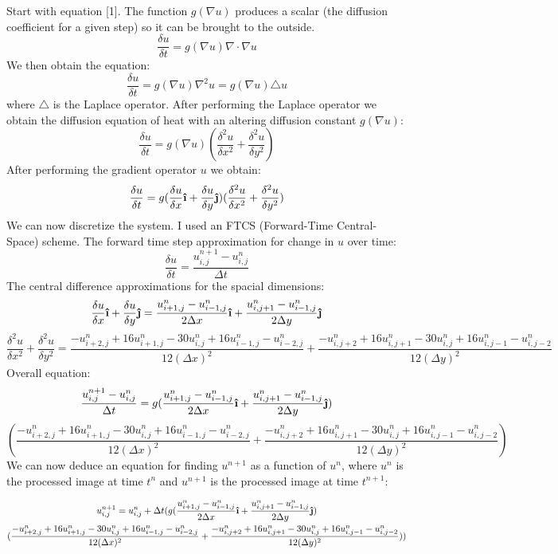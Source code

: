 \documentclass[12pt]{article}
\newcommand{\ihat}{\boldsymbol{\hat{\textbf{\i}}}}
\newcommand{\jhat}{\boldsymbol{\hat{\textbf{\j}}}}
\begin{document}
Start with equation [1]. The function $g(\nabla u)$ produces a scalar (the diffusion coefficient for a given step) so it can be brought to the outside.
$$\frac{\delta u}{\delta t}=g(\nabla u) \nabla \cdot \nabla u$$
We then obtain the equation:
$$\frac{\delta u}{\delta t}=g(\nabla u) \nabla^2 u = g(\nabla u) \triangle u$$
where $\triangle$ is the Laplace operator.
After performing the Laplace operator we obtain the diffusion equation of heat with an altering diffusion constant $g(\nabla u)$:
\begin{equation}
\frac{\delta u}{\delta t}=g(\nabla u)(\frac{\delta^2 u}{\delta x^2}+\frac{\delta^2 u}{\delta y^2})
\end{equation}
After performing the gradient operator $u$ we obtain:
$$\frac{\delta u}{\delta t}=g(\frac{\delta u}{\delta x}\ihat+\frac{\delta u}{\delta y}\jhat)(\frac{\delta^2 u}{\delta x^2}+\frac{\delta^2 u}{\delta y^2})$$
We can now discretize the system. I used an FTCS (Forward-Time Central-Space) scheme.
The forward time step approximation for change in $u$ over time:
$$\frac{\delta u}{\delta t}=\frac{u^{n+1}_{i,j} - u^{n}_{i,j}}{\Delta t}$$
The central difference approximations for the spacial dimensions:
$$\frac{\delta u}{\delta x}\ihat+\frac{\delta u}{\delta y}\jhat=\frac{u^{n}_{i+1,j}-u^{n}_{i-1,j}}{2\Delta x}\ihat + \frac{u^{n}_{i,j+1}-u^{n}_{i-1,j}}{2\Delta y}\jhat$$
$$\frac{\delta^2 u}{\delta x^2}+\frac{\delta^2 u}{\delta y^2}=\frac{-u^{n}_{i+2,j}+16u^{n}_{i+1,j}-30u^{n}_{i,j}+16u^{n}_{i-1,j}-u^{n}_{i-2,j}}{12(\Delta x)^2}+\frac{-u^{n}_{i,j+2}+16u^{n}_{i,j+1}-30u^{n}_{i,j}+16u^{n}_{i,j-1}-u^{n}_{i,j-2}}{12(\Delta y)^2}$$
Overall equation:
$$\frac{u^{n+1}_{i,j} - u^{n}_{i,j}}{\Delta t}=g(\frac{u^{n}_{i+1,j}-u^{n}_{i-1,j}}{2\Delta x}\ihat + \frac{u^{n}_{i,j+1}-u^{n}_{i-1,j}}{2\Delta y}\jhat)$$
$$(\frac{-u^{n}_{i+2,j}+16u^{n}_{i+1,j}-30u^{n}_{i,j}+16u^{n}_{i-1,j}-u^{n}_{i-2,j}}{12(\Delta x)^2}+\frac{-u^{n}_{i,j+2}+16u^{n}_{i,j+1}-30u^{n}_{i,j}+16u^{n}_{i,j-1}-u^{n}_{i,j-2}}{12(\Delta y)^2})$$
We can now deduce an equation for finding $u^{n+1}$ as a function of $u^{n}$, where $u^{n}$ is the processed image at time $t^n$ and $u^{n+1}$ is the processed image at time $t^{n+1}$:

\begin{multline}
u^{n+1}_{i,j} = u^{n}_{i,j} + \Delta t (g(\frac{u^{n}_{i+1,j}-u^{n}_{i-1,j}}{2\Delta x}\ihat + \frac{u^{n}_{i,j+1}-u^{n}_{i-1,j}}{2\Delta y}\jhat) \\
(\frac{-u^{n}_{i+2,j}+16u^{n}_{i+1,j}-30u^{n}_{i,j}+16u^{n}_{i-1,j}-u^{n}_{i-2,j}}{12(\Delta x)^2}+\frac{-u^{n}_{i,j+2}+16u^{n}_{i,j+1}-30u^{n}_{i,j}+16u^{n}_{i,j-1}-u^{n}_{i,j-2}}{12(\Delta y)^2}))
\end{multline}
\end{document}
